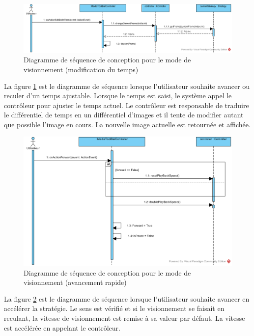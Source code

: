 \begin{figure}[htpb]
    \centering
    \includegraphics[scale=0.5]{fig/dsc_edit_delta_frame.png}
    \caption{Diagramme de séquence de conception pour le mode de visionnement (modification du temps)}
    \label{fig:dsc_view_edit_idx}
\end{figure}

La figure \ref{fig:dsc_view_edit_idx} est le diagramme de séquence lorsque l'utilisateur souhaite avancer ou reculer d'un temps ajustable.
Lorsque le temps est saisi, le système appel le contrôleur pour ajuster le temps actuel.
Le contrôleur est responsable de traduire le différentiel de temps en un différentiel d'images et il tente de modifier autant que possible l'image en cours.
La nouvelle image actuelle est retournée et affichée.

\begin{figure}[htpb]
    \centering
    \includegraphics[scale=0.45]{fig/dsc_forward_frame_index.png}
    \caption{Diagramme de séquence de conception pour le mode de visionnement (avancement rapide)}
    \label{fig:dsc_view_forward}
\end{figure}

La figure \ref{fig:dsc_view_forward} est le diagramme de séquence lorsque l'utilisateur souhaite avancer en accélérer la stratégie.
Le sens est vérifié et si le visionnement se faisait en reculant, la vitesse de visionnement est remise à sa valeur par défaut.
La vitesse est accélérée en appelant le contrôleur.

